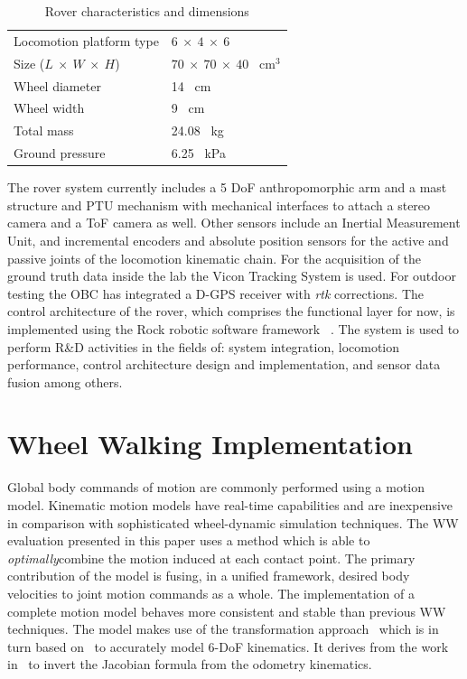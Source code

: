 \documentclass[a4paper,twocolumn]{esapub2005} %
\begin{document}
\begin{table}[h]
	\begin{tabular}{ll}
	Locomotion platform type       & $6~\times~4~\times~6$             \\
	Size ($L~\times~W~\times~H$)   & $70~\times~70~\times~40$ ~\unit{cm$^3$} \\
	Wheel diameter                 & 14 ~\unit{cm}    \\
	Wheel width                    & 9 ~\unit{cm}     \\
	Total mass                     & 24.08 ~\unit{kg} \\
	Ground pressure                & 6.25 ~\unit{kPa}        
	\end{tabular}
	\caption{Rover characteristics and dimensions}
	\label{tab:ExoterDimensionsTable}
\end{table}

The rover system currently includes a 5 DoF anthropomorphic arm and a mast
structure and PTU mechanism with mechanical interfaces to attach a stereo
camera and a ToF camera as well. Other sensors include an Inertial Measurement
Unit, and incremental encoders and absolute position sensors for the active and
passive joints of the locomotion kinematic chain. For the acquisition of the
ground truth data inside the lab the Vicon Tracking System is used. For outdoor
testing the OBC has integrated a D-GPS receiver with \textit{rtk} corrections.
The control architecture of the rover, which comprises the functional layer for
now, is implemented using the Rock robotic software framework ~\cite{}. The
system is used to perform R\&D activities in the fields of: system integration,
locomotion performance, control architecture design and implementation, and
sensor data fusion among others. 

\section{Wheel Walking Implementation}

Global body commands of motion are commonly performed using a motion model.
Kinematic motion models have real-time capabilities and are inexpensive in
comparison with sophisticated wheel-dynamic simulation techniques.  The
WW evaluation presented in this paper uses a method which is able to
\textit{optimally}\footnotemark[1] combine the motion induced at each contact
point. The primary contribution of the model is fusing, in a unified framework,
desired body velocities to joint motion commands as a whole.  The
implementation of a complete motion model behaves more consistent and stable
than previous WW techniques. The model makes use of the
transformation approach~\cite{Tarokh2005} which is in turn based 
on~\cite{MuirNeumann1987} to accurately model 6-DoF kinematics.
It derives from the work in~\cite{Hidalgo-Carrio2014} to invert the Jacobian
formula from the odometry kinematics.
\end{document}
